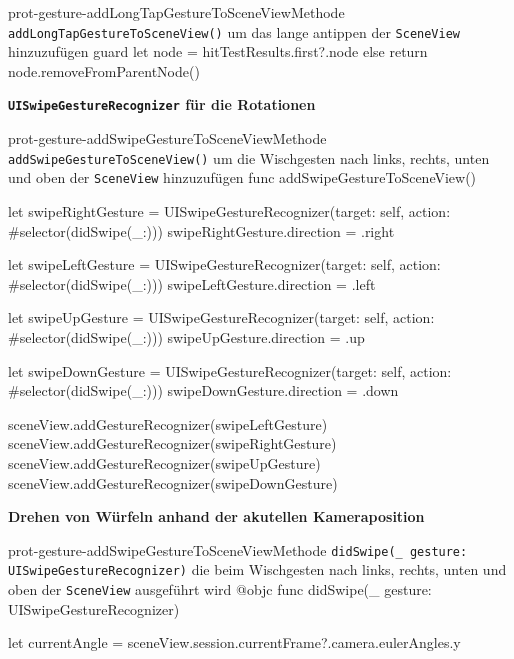 \begin{description}
\begin{code}{prot-gesture-addLongTapGestureToSceneView}{Methode \texttt{addLongTapGestureToSceneView()} um das lange antippen der \texttt{SceneView} hinzuzufügen}
{        guard let node = hitTestResults.first?.node else { return }
        node.removeFromParentNode()
    }
    \end{code}
    
    \textbf{\texttt{UISwipeGestureRecognizer} für die Rotationen}\\
    
    \begin{code}{prot-gesture-addSwipeGestureToSceneView}{Methode \texttt{addSwipeGestureToSceneView()} um die Wischgesten nach links, rechts, unten und oben der \texttt{SceneView} hinzuzufügen}
    func addSwipeGestureToSceneView() {
        let swipeRightGesture = UISwipeGestureRecognizer(target: self, action: #selector(didSwipe(_:)))
        swipeRightGesture.direction = .right
        
        let swipeLeftGesture = UISwipeGestureRecognizer(target: self, action: #selector(didSwipe(_:)))
        swipeLeftGesture.direction = .left
        
        let swipeUpGesture = UISwipeGestureRecognizer(target: self, action: #selector(didSwipe(_:)))
        swipeUpGesture.direction = .up
        
        let swipeDownGesture = UISwipeGestureRecognizer(target: self, action: #selector(didSwipe(_:)))
        swipeDownGesture.direction = .down
        
        sceneView.addGestureRecognizer(swipeLeftGesture)
        sceneView.addGestureRecognizer(swipeRightGesture)
        sceneView.addGestureRecognizer(swipeUpGesture)
        sceneView.addGestureRecognizer(swipeDownGesture)
    }
    \end{code}


    \textbf{Drehen von Würfeln anhand der akutellen Kameraposition}\\

    \begin{code}{prot-gesture-addSwipeGestureToSceneView}{Methode \texttt{didSwipe(_ gesture: UISwipeGestureRecognizer)} die beim Wischgesten nach links, rechts, unten und oben der \texttt{SceneView} ausgeführt wird}
    @objc
    func didSwipe(_ gesture: UISwipeGestureRecognizer) {
        let currentAngle = sceneView.session.currentFrame?.camera.eulerAngles.y
        
}
\end{code}
\end{description}
